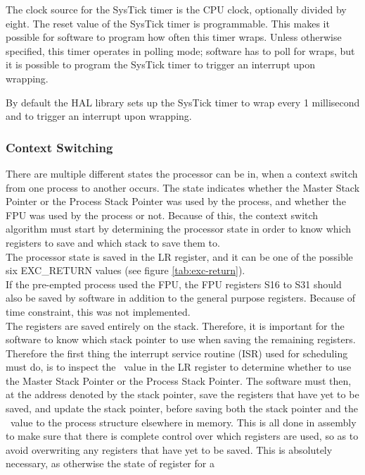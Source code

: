The clock source for the SysTick timer is the CPU clock, optionally divided by
eight. The reset value of the SysTick timer is programmable. This makes it
possible for software to program how often this timer wraps.
Unless otherwise specified, this timer operates in polling mode; software has to
poll for wraps, but it is possible to program the SysTick timer to trigger an
interrupt upon wrapping.

By default the HAL library sets up the SysTick timer to wrap every 1 millisecond
and to trigger an interrupt upon wrapping.

\subsubsection{Context Switching}
There are multiple different states the processor can be in, when a context
switch from one process to another occurs. The state indicates whether the
Master Stack Pointer or the Process Stack Pointer was used by the process,
and whether the FPU was used by the process or not. Because of this, the context
switch algorithm must start by determining the processor state in order to know
which registers
to save and which stack to save them to.\\
The processor state is saved in the LR register, and it can be one of
the possible six EXC\_RETURN values (see figure \ref{tab:exc-return}).\\
If the pre-empted process used the FPU, the FPU registers S16 to S31
should also be saved by software in addition to the general purpose registers.
Because of time constraint, this was not implemented.\\
The registers are saved entirely on the stack. Therefore, it is important for
the software to know which
stack pointer to use when saving the remaining registers. Therefore the first
thing the interrupt service routine (ISR) used for scheduling must do, is to inspect
the \excreturn\ value in the LR register to determine whether to use the
Master Stack Pointer or the Process Stack Pointer. The software must then, at
the address denoted by the stack pointer, save the registers that have yet to be
saved, and update the stack pointer, before saving both the stack pointer and
the \excreturn\ value to the process structure elsewhere in memory. This is all
done in assembly to make sure that there is complete control over which
registers are used, so as to avoid overwriting any registers that have yet to be
saved. This is absolutely necessary, as otherwise the state of register for a

